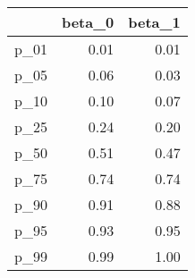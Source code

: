\begin{table}[ht]
\centering
\begin{tabular}{rrr}
  \hline
 & beta\_0 & beta\_1 \\ 
  \hline
p\_01 & 0.01 & 0.01 \\ 
  p\_05 & 0.06 & 0.03 \\ 
  p\_10 & 0.10 & 0.07 \\ 
  p\_25 & 0.24 & 0.20 \\ 
  p\_50 & 0.51 & 0.47 \\ 
  p\_75 & 0.74 & 0.74 \\ 
  p\_90 & 0.91 & 0.88 \\ 
  p\_95 & 0.93 & 0.95 \\ 
  p\_99 & 0.99 & 1.00 \\ 
   \hline
\end{tabular}
\end{table}
